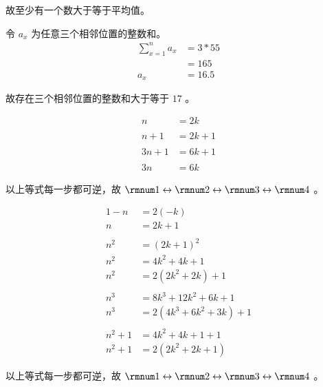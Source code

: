 {{\begin{practices}
            故至少有一个数大于等于平均值。
        \end{practices}

        \begin{practices}
            令 $a_x$ 为任意三个相邻位置的整数和。
            \begin{align*}
                \sum_{x = 1}^{n} a_x &= 3 * 55 \\
                &= 165 \\
                a_x &= 16.5
            \end{align*}

            故存在三个相邻位置的整数和大于等于 $17$ 。
        \end{practices}

        \begin{practices}
            \begin{align*}
                n &= 2k \\
                \\
                n + 1 &= 2k + 1 \\
                \\
                3n + 1 &= 6k + 1 \\
                \\
                3n &= 6k
            \end{align*}

            以上等式每一步都可逆，故 $\rmnum 1 \leftrightarrow \rmnum 2 \leftrightarrow \rmnum 3 \leftrightarrow \rmnum 4$ 。
        \end{practices}

        \begin{practices}
            \begin{align*}
                1 - n &= 2(-k) \\
                n &= 2k + 1 \\
                \\
                n^2 &= (2k + 1)^2 \\
                n^2 &= 4k^2 + 4k + 1 \\
                n^2 &= 2(2k^2 + 2k) + 1 \\
                \\
                n^3 &= 8k^3 + 12k^2 + 6k + 1 \\
                n^3 &= 2(4k^3 + 6k^2 + 3k) + 1 \\
                \\
                n^2 + 1 &= 4k^2 + 4k + 1 + 1 \\
                n^2 + 1 &= 2(2k^2 + 2k + 1)
            \end{align*}

            以上等式每一步都可逆，故 $\rmnum 1 \leftrightarrow \rmnum 2 \leftrightarrow \rmnum 3 \leftrightarrow \rmnum 4$ 。
        \end{practices}
    }
}

